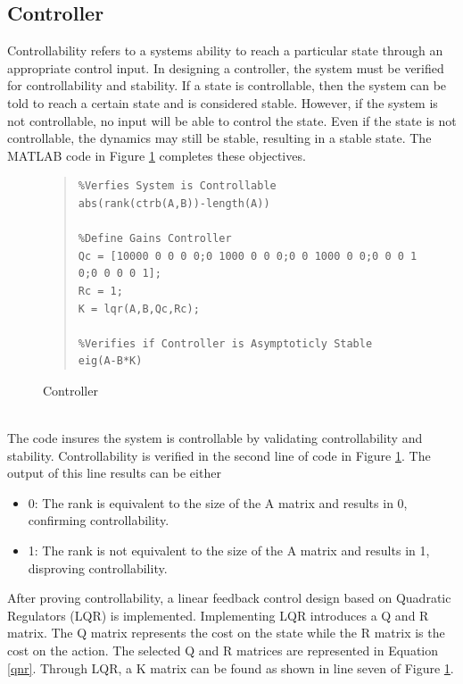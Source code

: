 \documentclass[12pt]{article}
\begin{document}
\subsection{Controller}
Controllability refers to a systems ability to reach a particular state through an appropriate control input. In designing a controller, the system must be verified for controllability and stability. If a state is controllable, then the system can be told to reach a certain state and is considered stable. However, if the system is not controllable, no input will be able to control the state. Even if the state is not controllable, the dynamics may still be stable, resulting in a stable state. The MATLAB code in Figure \ref{fig:cont} completes these objectives.
\begin{figure}[!h]
\begin{quote}
\begin{lstlisting}
%Verfies System is Controllable
abs(rank(ctrb(A,B))-length(A))

%Define Gains Controller
Qc = [10000 0 0 0 0;0 1000 0 0 0;0 0 1000 0 0;0 0 0 1 0;0 0 0 0 1];
Rc = 1;
K = lqr(A,B,Qc,Rc);

%Verifies if Controller is Asymptoticly Stable
eig(A-B*K)
\end{lstlisting}
\end{quote}
\caption{Controller\label{fig:cont}}
\end{figure}
\\
The code insures the system is controllable by validating controllability and stability. Controllability is verified in the second line of code in Figure \ref{fig:cont}. The output of this line results can be either
\begin{itemize}
\item 0: The rank is equivalent to the size of the A matrix and results in 0, confirming controllability.
\item 1: The rank is not equivalent to the size of the A matrix and results in 1, disproving controllability. 
\end{itemize}
After proving controllability, a linear feedback control design based on Quadratic Regulators (LQR) is implemented. Implementing LQR introduces a Q and R matrix. The Q matrix represents the cost on the state while the R matrix is the cost on the action. The selected Q and R matrices are represented in Equation \eqref{qnr}. Through LQR, a K matrix can be found as shown in line seven of Figure \ref{fig:cont}.
\\ \\
\end{document}

